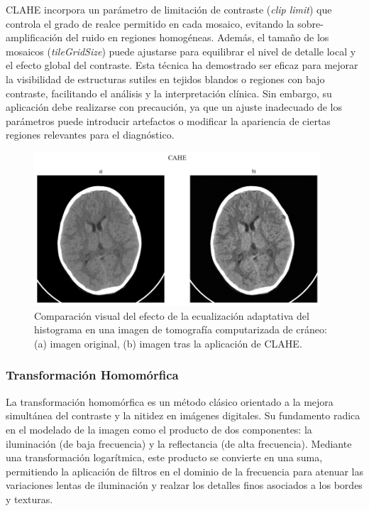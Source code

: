 CLAHE incorpora un parámetro de limitación de contraste (\emph{clip limit}) que controla el grado de realce permitido en cada mosaico, evitando la sobre-amplificación del ruido en regiones homogéneas. Además, el tamaño de los mosaicos (\emph{tileGridSize}) puede ajustarse para equilibrar el nivel de detalle local y el efecto global del contraste. Esta técnica ha demostrado ser eficaz para mejorar la visibilidad de estructuras sutiles en tejidos blandos o regiones con bajo contraste, facilitando el análisis y la interpretación clínica. Sin embargo, su aplicación debe realizarse con precaución, ya que un ajuste inadecuado de los parámetros puede introducir artefactos o modificar la apariencia de ciertas regiones relevantes para el diagnóstico.

\begin{figure}[H]
    \centering
    \includegraphics[width=0.95\textwidth]{Graphics/cahe.png}
    \caption{Comparación visual del efecto de la ecualización adaptativa del histograma en una imagen de tomografía computarizada de cráneo: (a) imagen original, (b) imagen tras la aplicación de CLAHE.}
    \label{fig:filter-clahe}
\end{figure}

\subsubsection{Transformación Homomórfica}

La transformación homomórfica \cite{HomomorphicFilter} es un método clásico orientado a la mejora simultánea del contraste y la nitidez en imágenes digitales. Su fundamento radica en el modelado de la imagen como el producto de dos componentes: la iluminación (de baja frecuencia) y la reflectancia (de alta frecuencia). Mediante una transformación logarítmica, este producto se convierte en una suma, permitiendo la aplicación de filtros en el dominio de la frecuencia para atenuar las variaciones lentas de iluminación y realzar los detalles finos asociados a los bordes y texturas.

